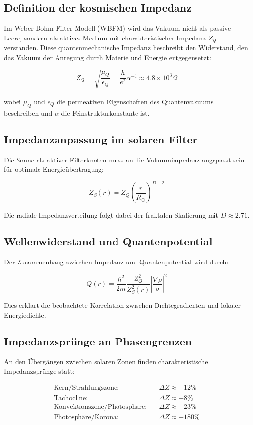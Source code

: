 \subsection{Definition der kosmischen Impedanz}

Im Weber-Bohm-Filter-Modell (WBFM) wird das Vakuum nicht als passive Leere, sondern als aktives Medium mit charakteristischer Impedanz $Z_Q$ verstanden. Diese quantenmechanische Impedanz beschreibt den Widerstand, den das Vakuum der Anregung durch Materie und Energie entgegensetzt:

\[
Z_Q = \sqrt{\frac{\mu_Q}{\epsilon_Q}} = \frac{h}{e^2} \alpha^{-1} \approx 4.8 \times 10^3  \Omega
\]

wobei $\mu_Q$ und $\epsilon_Q$ die permeativen Eigenschaften des Quantenvakuums beschreiben und $\alpha$ die Feinstrukturkonstante ist.

\subsection{Impedanzanpassung im solaren Filter}

Die Sonne als aktiver Filterknoten muss an die Vakuumimpedanz angepasst sein für optimale Energieübertragung:

\[
Z_S(r) = Z_Q \left(\frac{r}{R_\odot}\right)^{D-2}
\]

Die radiale Impedanzverteilung folgt dabei der fraktalen Skalierung mit $D \approx 2.71$.

\subsection{Wellenwiderstand und Quantenpotential}

Der Zusammenhang zwischen Impedanz und Quantenpotential wird durch:

\[
Q(r) = \frac{\hbar^2}{2m} \frac{Z_Q^2}{Z_S^2(r)} \left|\frac{\nabla \rho}{\rho}\right|^2
\]

Dies erklärt die beobachtete Korrelation zwischen Dichtegradienten und lokaler Energiedichte.

\subsection{Impedanzsprünge an Phasengrenzen}

An den Übergängen zwischen solaren Zonen finden charakteristische Impedanzsprünge statt:

\begin{align*}
\text{Kern/Strahlungszone:} &\quad \Delta Z \approx +12\% \\
\text{Tachocline:} &\quad \Delta Z \approx -8\% \\
\text{Konvektionszone/Photosphäre:} &\quad \Delta Z \approx +23\% \\
\text{Photosphäre/Korona:} &\quad \Delta Z \approx +180\%
\end{align*}

